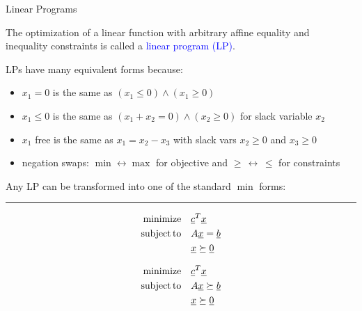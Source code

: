 \documentclass[10pt,english,hide notes,aspectratio=169]{beamer}
\begin{document}
\begin{frame}{Linear Programs}

The optimization of a linear function with arbitrary affine equality and \\ inequality constraints is called a \textcolor{blue}{linear program (LP)}.

\vspace{3mm}

LPs have many equivalent forms because:
\begin{itemize}

\item $x_1 \!=\! 0$ is the same as $(x_1 \leq 0) \wedge (x_1\geq 0)$
\item $x_1 \leq 0$ is the same as $(x_1 + x_2 = 0) \wedge (x_2 \geq 0)$ for slack variable $x_2$
\item $x_1$ free is the same as $x_1 = x_2 - x_3$ with slack vars $x_2 \geq 0$ and $x_3 \geq 0$
\item negation swaps: $\min \leftrightarrow \max$ for objective and $\geq \,\leftrightarrow\, \leq$ for constraints
\end{itemize}  

\begin{definition}
Any LP can be transformed into one of the standard $\min$ forms: \\[1mm]
\hrule \vspace{0mm}
\begin{minipage}{0.49\textwidth}
\vspace{-2mm}
\begin{align*}
\mathrm{minimize} \quad & \underline{c}^T \underline{x} \\
\mathrm{subject\,to} \quad & A \underline{x} = \underline{b} \\
& \underline{x} \succeq \underline{0}
\end{align*}
\end{minipage}
\vrule
\begin{minipage}{0.49\textwidth}
\vspace{-2mm}
\begin{align*}
\mathrm{minimize} \quad & \underline{c}^T \underline{x} \\
\mathrm{subject\,to} \quad & A \underline{x} \succeq \underline{b} \\
& \underline{x} \succeq \underline{0}
\end{align*}
\end{minipage}
\end{definition}

\end{frame}
\end{document}
